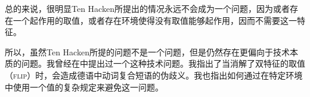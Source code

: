 总的来说，很明显Ten Hacken所提出的情况永远不会成为一个问题，因为或者存在一个起作用的取值，或者存在环境使得没有取值能够起作用，因而不需要这一特征。

所以，虽然Ten Hacken所提的问题不是一个问题，但是仍然存在更偏向于技术本质的问题。我曾经在中提出过一个这种技术问题。我指出了当消解了双特征的取值（\textsc{flip}）时，会造成德语中动词复合短语的伪歧义。我也指出如何通过在特定环境中使用一个值的复杂规定来避免这一问题。


